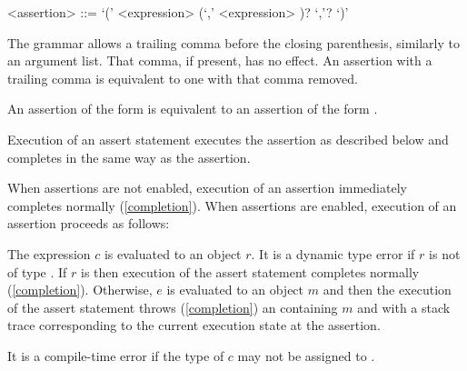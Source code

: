 \documentclass[makeidx]{article}
\begin{document}
{\begin{grammar}
<assertion> ::= \ASSERT{} `(' <expression> (`,' <expression> )? `,'? `)'
\end{grammar}

\LMHash{}%
The grammar allows a trailing comma before the closing parenthesis,
similarly to an argument list.
That comma, if present, has no effect.
An assertion with a trailing comma is equivalent to one with that comma removed.

\LMHash{}%
An assertion of the form  is equivalent to an assertion of the form .

\LMHash{}%
Execution of an assert statement executes the assertion as described below
and completes in the same way as the assertion.

\LMHash{}%
When assertions are not enabled,
execution of an assertion immediately completes normally
(\ref{completion}).
When assertions are enabled,
execution of an assertion  proceeds as follows:

\LMHash{}%
The expression $c$ is evaluated to an object $r$.
It is a dynamic type error if $r$ is not of type .
If $r$ is \TRUE{} then execution of the assert statement completes normally (\ref{completion}).
Otherwise, $e$ is evaluated to an object $m$
and then the execution of the assert statement throws (\ref{completion}) an  containing $m$ and with a stack trace corresponding to the current execution state at the assertion.

\LMHash{}%
It is a compile-time error if the type of $c$ may not be assigned to .




}
\end{document}
